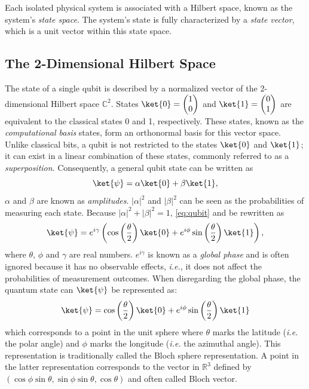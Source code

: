 \begin{definition} \cite{nielsen2010quantum}
  Each isolated physical system is associated with a Hilbert space, known as the system's \emph{state space}. The system's state is fully characterized by a \emph{state vector}, which is a unit vector within this state space.
\end{definition}

\subsection{The 2-Dimensional Hilbert Space} \label{subsec:hilb2D}
 The state of a single qubit is described by a normalized vector of the 2-dimensional Hilbert space $\mathbb{C}^{2}$. States $\ket{0} = \begin{pmatrix} 1\\0 \end{pmatrix} $ and  $\ket{1} =   \begin{pmatrix} 0\\1 \end{pmatrix} $ are equivalent to the classical states 0 and 1, respectively.  These states, known as the \emph{computational basis} states, form an orthonormal basis for this vector space. Unlike classical bits, a qubit is not restricted to the states $\ket{0}$ and $\ket{1}$; it can exist in a linear combination of these states, commonly referred to as a \emph{superposition}. Consequently, a general qubit state can be written as
\begin{equation} \label{eq:qubit}
  \ket{\psi} = \alpha \ket{0} + \beta \ket{1},
\end{equation}
$\alpha$ and $\beta$ are known as \emph{amplitudes}. $|\alpha|^{2}$ and  $|\beta|^{2}$ can be seen as the probabilities of measuring each state. Because $|\alpha|^{2} + |\beta|^{2} = 1$,  \autoref{eq:qubit} and be rewritten as
\begin{equation} \label{eq:qubit2}
  \ket{\psi} = e^{i \gamma} \left(\cos\left(\frac{\theta}{2}\right) \ket{0} + e^{i\phi}\sin\left(\frac{\theta}{2}\right)\ket{1}\right),
\end{equation}
where $\theta$, $\phi$ and $\gamma$ are real numbers. $e^{i \gamma}$ is known as a \textit{global phase} and is often ignored because it has no observable effects, \textit{i.e.}, it does not affect the probabilities of measurement outcomes. When disregarding the global phase, the quantum state can $ \ket{\psi}$ be represented as:
\begin{equation} \label{eq:qubit3}
  \ket{\psi} = \cos\left(\frac{\theta}{2}\right) \ket{0} + e^{i\phi}\sin\left(\frac{\theta}{2}\right)\ket{1}
\end{equation}
which corresponds to a point in the unit sphere where $\theta$ marks the latitude (\textit{i.e.} the polar angle) and $\phi$ marks the longitude (\textit{i.e.} the azimuthal angle). This representation is traditionally called the Bloch sphere representation. A point in the latter representation
corresponds to the vector in $\mathbb{R}^{3}$ defined by $(\cos \phi \sin \theta, \sin \phi \sin \theta, \cos \theta)$ and often called Bloch vector.
 
